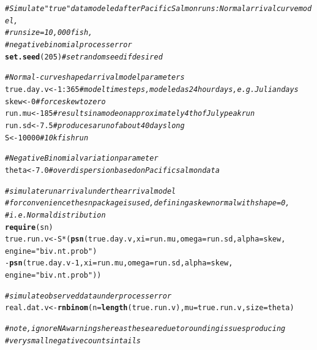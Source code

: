 \documentclass[12pt]{article}\usepackage[]{graphicx}\usepackage[]{color}
\makeatletter
\newcommand{\hlnum}[1]{\textcolor[rgb]{0.686,0.059,0.569}{#1}}%
\newcommand{\hlstr}[1]{\textcolor[rgb]{0.192,0.494,0.8}{#1}}%
\newcommand{\hlcom}[1]{\textcolor[rgb]{0.678,0.584,0.686}{\textit{#1}}}%
\newcommand{\hlopt}[1]{\textcolor[rgb]{0,0,0}{#1}}%
\newcommand{\hlstd}[1]{\textcolor[rgb]{0.345,0.345,0.345}{#1}}%
\newcommand{\hlkwb}[1]{\textcolor[rgb]{0.69,0.353,0.396}{#1}}%
\newcommand{\hlkwc}[1]{\textcolor[rgb]{0.333,0.667,0.333}{#1}}%
\newcommand{\hlkwd}[1]{\textcolor[rgb]{0.737,0.353,0.396}{\textbf{#1}}}%
\newenvironment{kframe}{%
 \def\at@end@of@kframe{}%
 \ifinner\ifhmode%
  \def\at@end@of@kframe{\end{minipage}}%
  \begin{minipage}{\columnwidth}%
 \fi\fi%
 \def\FrameCommand##1{\hskip\@totalleftmargin \hskip-\fboxsep
 \colorbox{shadecolor}{##1}\hskip-\fboxsep
     \hskip-\linewidth \hskip-\@totalleftmargin \hskip\columnwidth}%
 \MakeFramed {\advance\hsize-\width
   \@totalleftmargin\z@ \linewidth\hsize
   \@setminipage}}%
 {\par\unskip\endMakeFramed%
 \at@end@of@kframe}
\newenvironment{knitrout}{}{} %
\makeatother
\begin{document}
\begin{knitrout}\footnotesize
{}\color{fgcolor}\begin{kframe}
\begin{alltt}
\hlcom{#Simulate "true" data modeled after Pacific Salmon runs: Normal arrival curve model, }
\hlcom{#run size = 10,000 fish,}
\hlcom{#negative binomial process error}
\hlkwd{set.seed}\hlstd{(}\hlnum{205}\hlstd{)} \hlcom{# set random seed if desired}

\hlcom{# Normal-curve shaped arrival model parameters}
\hlstd{true.day.v} \hlkwb{<-} \hlnum{1}\hlopt{:}\hlnum{365} \hlcom{# model time steps, modeled as 24 hour days, e.g. Julian days}
\hlstd{skew} \hlkwb{<-} \hlnum{0} \hlcom{# force skew to zero}
\hlstd{run.mu} \hlkwb{<-} \hlnum{185} \hlcom{# results in a mode on approximately 4th of July peak run}
\hlstd{run.sd} \hlkwb{<-} \hlnum{7.5} \hlcom{# produces a run of about 40 days long}
\hlstd{S} \hlkwb{<-} \hlnum{10000} \hlcom{# 10k fish run}

\hlcom{#Negative Binomial variation parameter}
\hlstd{theta} \hlkwb{<-} \hlnum{7.0} \hlcom{#overdispersion based on Pacific salmon data}

\hlcom{# simulate run arrival under the arrival model}
\hlcom{# for convenience the sn package is used, defining a skewnormal with shape = 0, }
\hlcom{#i.e. Normal distribution}
\hlkwd{require}\hlstd{(sn)}
\hlstd{true.run.v} \hlkwb{<-} \hlstd{S}\hlopt{*}\hlstd{(}\hlkwd{psn}\hlstd{(true.day.v,} \hlkwc{xi} \hlstd{= run.mu,} \hlkwc{omega} \hlstd{= run.sd,} \hlkwc{alpha} \hlstd{= skew,}
                     \hlkwc{engine} \hlstd{=} \hlstr{"biv.nt.prob"}\hlstd{)}
                 \hlopt{-} \hlkwd{psn}\hlstd{(true.day.v} \hlopt{-} \hlnum{1}\hlstd{,} \hlkwc{xi} \hlstd{= run.mu,} \hlkwc{omega} \hlstd{= run.sd,} \hlkwc{alpha} \hlstd{= skew,}
                       \hlkwc{engine} \hlstd{=} \hlstr{"biv.nt.prob"}\hlstd{))}

\hlcom{# simulate observed data under process error}
\hlstd{real.dat.v} \hlkwb{<-} \hlkwd{rnbinom}\hlstd{(}\hlkwc{n} \hlstd{=} \hlkwd{length}\hlstd{(true.run.v),} \hlkwc{mu} \hlstd{= true.run.v,} \hlkwc{size} \hlstd{= theta)}

\hlcom{# note, ignore NA warnings here as these are due to rounding issues producing }
\hlcom{#very small negative counts in tails}
\end{alltt}
\end{kframe}
\end{knitrout}
\end{document}
